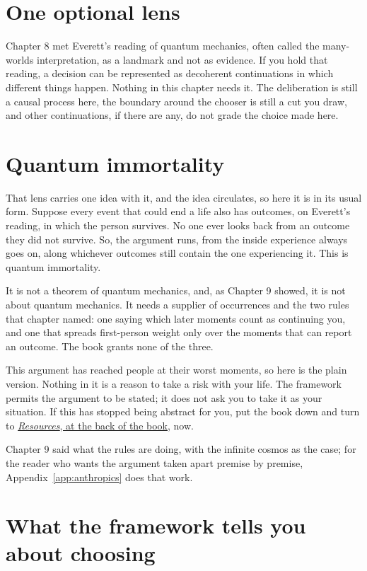 \section*{One optional lens}

Chapter 8 met Everett's reading of quantum mechanics, often called the many-worlds interpretation, as a landmark and not as evidence. If you hold that reading, a decision can be represented as decoherent continuations in which different things happen. Nothing in this chapter needs it. The deliberation is still a causal process here, the boundary around the chooser is still a cut you draw, and other continuations, if there are any, do not grade the choice made here.

\section*{Quantum immortality}

That lens carries one idea with it, and the idea circulates, so here it is in its usual form. Suppose every event that could end a life also has outcomes, on Everett's reading, in which the person survives. No one ever looks back from an outcome they did not survive. So, the argument runs, from the inside experience always goes on, along whichever outcomes still contain the one experiencing it. This is quantum immortality.

It is not a theorem of quantum mechanics, and, as Chapter 9 showed, it is not about quantum mechanics. It needs a supplier of occurrences and the two rules that chapter named: one saying which later moments count as continuing you, and one that spreads first-person weight only over the moments that can report an outcome. The book grants none of the three.

This argument has reached people at their worst moments, so here is the plain version. Nothing in it is a reason to take a risk with your life. The framework permits the argument to be stated; it does not ask you to take it as your situation. If this has stopped being abstract for you, put the book down and turn to \hyperref[resources]{\textit{Resources}, at the back of the book}, now.

Chapter 9 said what the rules are doing, with the infinite cosmos as the case; for the reader who wants the argument taken apart premise by premise, Appendix~\ref{app:anthropics} does that work.

\section*{What the framework tells you about choosing}

